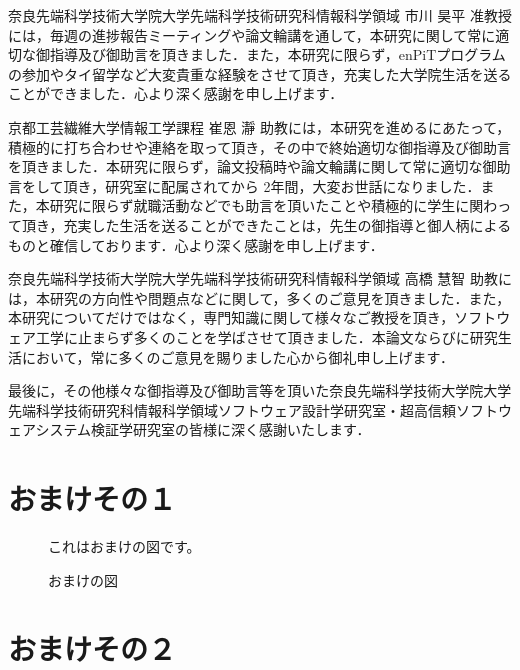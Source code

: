 \documentclass[12pt]{jarticle} %
\begin{document}
奈良先端科学技術大学院大学先端科学技術研究科情報科学領域 市川 昊平 准教授には，毎週の進捗報告ミーティングや論文輪講を通して，本研究に関して常に適切な御指導及び御助言を頂きました．また，本研究に限らず，enPiTプログラムの参加やタイ留学など大変貴重な経験をさせて頂き，充実した大学院生活を送ることができました．心より深く感謝を申し上げます．

京都工芸繊維大学情報工学課程 崔恩 瀞 助教には，本研究を進めるにあたって，積極的に打ち合わせや連絡を取って頂き，その中で終始適切な御指導及び御助言を頂きました．本研究に限らず，論文投稿時や論文輪講に関して常に適切な御助言をして頂き，研究室に配属されてから 2年間，大変お世話になりました．また，本研究に限らず就職活動などでも助言を頂いたことや積極的に学生に関わって頂き，充実した生活を送ることができたことは，先生の御指導と御人柄によるものと確信しております．心より深く感謝を申し上げます．

奈良先端科学技術大学院大学先端科学技術研究科情報科学領域 高橋 慧智 助教には，本研究の方向性や問題点などに関して，多くのご意見を頂きました．また，本研究についてだけではなく，専門知識に関して様々なご教授を頂き，ソフトウェア工学に止まらず多くのことを学ばさせて頂きました．本論文ならびに研究生活において，常に多くのご意見を賜りました心から御礼申し上げます．
 
最後に，その他様々な御指導及び御助言等を頂いた奈良先端科学技術大学院大学先端科学技術研究科情報科学領域ソフトウェア設計学研究室・超高信頼ソフトウェアシステム検証学研究室の皆様に深く感謝いたします．


%
%
\newpage


%
%
\appendix

\section{おまけその１}
\label{omake1}



\begin{figure}
\centerline{これはおまけの図です。}
\caption{おまけの図}
\end{figure}


\section{おまけその２}
\end{document}
